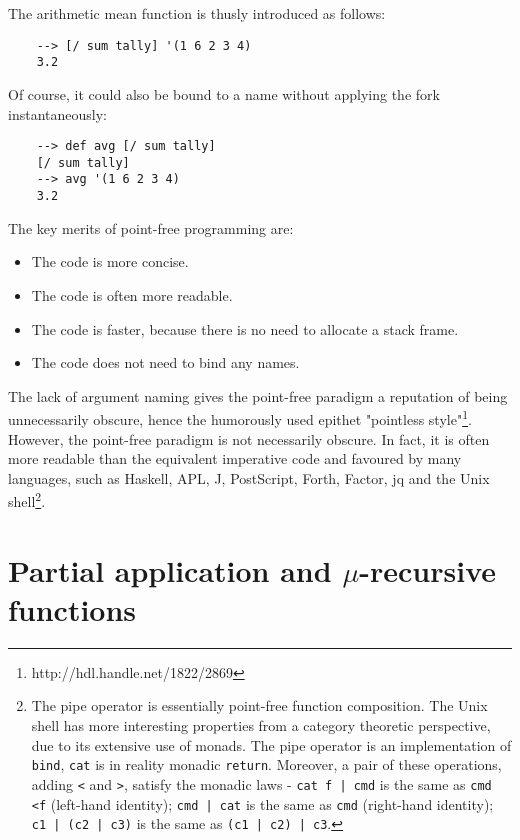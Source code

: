 The arithmetic mean function is thusly introduced as follows:

\begin{Verbatim}
    --> [/ sum tally] '(1 6 2 3 4)
    3.2
\end{Verbatim}

Of course, it could also be bound to a name without applying the fork instantaneously:

\begin{Verbatim}
    --> def avg [/ sum tally]
    [/ sum tally]
    --> avg '(1 6 2 3 4)
    3.2
\end{Verbatim}

The key merits of point-free programming are:

\begin{itemize}
    \item The code is more concise.
    \item The code is often more readable.
    \item The code is faster, because there is no need to allocate a stack frame.
    \item The code does not need to bind any names.
\end{itemize}

The lack of argument naming gives the point-free paradigm a reputation of being unnecessarily obscure, hence the humorously used epithet "pointless style"\footnote{http://hdl.handle.net/1822/2869}. However, the point-free paradigm is not necessarily obscure. In fact, it is often more readable than the equivalent imperative code and favoured by many languages, such as Haskell, APL, J, PostScript, Forth, Factor, jq and the Unix shell\footnote{The pipe operator is essentially point-free function composition. The Unix shell has more interesting properties from a category theoretic perspective, due to its extensive use of monads. The pipe operator is an implementation of \verb|bind|, \verb|cat| is in reality monadic \verb|return|. Moreover, a pair of these operations, adding \verb|<| and \verb|>|, satisfy the monadic laws - \verb$cat f | cmd$ is the same as \verb|cmd <f| (left-hand identity); \verb$cmd | cat$ is the same as \verb|cmd| (right-hand identity); \verb$c1 | (c2 | c3)$ is the same as \verb$(c1 | c2) | c3$.}.

\section{Partial application and \texorpdfstring{$\mu$}{mu}-recursive functions}

